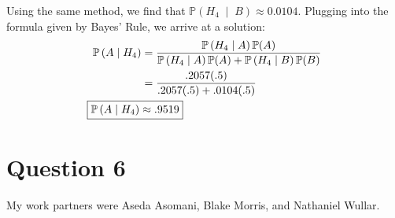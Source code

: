 \documentclass[titlepage, 12pt, leqno]{article}
\begin{document}
Using the same method, we find that $ \mathbb{P}\left(H_4 \;\middle|\; B\right) 
\approx 0.0104$. Plugging into the formula given by Bayes' Rule, we arrive at
a solution:
\begin{align*}
    \mathbb{P}\left(A \;\middle|\; H_4\right) &= \frac{
\mathbb{P}\left(H_4 \;\middle|\; A\right) \mathbb{P}(A)}{
\mathbb{P}\left(H_4 \;\middle|\; A\right) \mathbb{P}(A) + 
\mathbb{P}\left(H_4 \;\middle|\; B\right) \mathbb{P}(B)} \\
&= \frac{.2057(.5)}{.2057(.5)+.0104(.5)} \\
        \Aboxed{ \mathbb{P}\left(A \;\middle|\; H_4\right) &\approx .9519} 
\end{align*}

\pagebreak
\section{Question 6}
My work partners were Aseda Asomani, Blake Morris, and Nathaniel Wullar.
\end{document}
